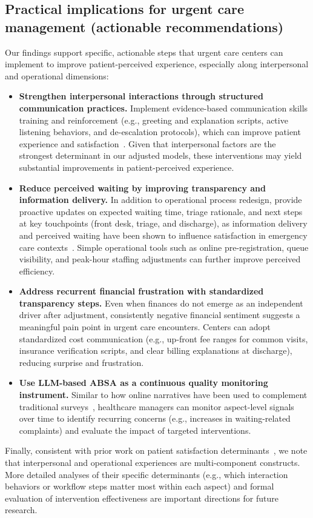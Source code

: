 \documentclass[journal,twoside,web]{ieeecolor}
\begin{document}
\subsection{Practical implications for urgent care management (actionable recommendations)}
Our findings support specific, actionable steps that urgent care centers can implement to improve patient-perceived experience, especially along interpersonal and operational dimensions:
\begin{itemize}
    \item \textbf{Strengthen interpersonal interactions through structured communication practices.} Implement evidence-based communication skills training and reinforcement (e.g., greeting and explanation scripts, active listening behaviors, and de-escalation protocols), which can improve patient experience and satisfaction~\cite{brown1999communication,derksen2013effectiveness}. Given that interpersonal factors are the strongest determinant in our adjusted models, these interventions may yield substantial improvements in patient-perceived experience.
    \item \textbf{Reduce perceived waiting by improving transparency and information delivery.} In addition to operational process redesign, provide proactive updates on expected waiting time, triage rationale, and next steps at key touchpoints (front desk, triage, and discharge), as information delivery and perceived waiting have been shown to influence satisfaction in emergency care contexts~\cite{thompson1996waiting,krishel1993info}. Simple operational tools such as online pre-registration, queue visibility, and peak-hour staffing adjustments can further improve perceived efficiency.
    \item \textbf{Address recurrent financial frustration with standardized transparency steps.} Even when finances do not emerge as an independent driver after adjustment, consistently negative financial sentiment suggests a meaningful pain point in urgent care encounters. Centers can adopt standardized cost communication (e.g., up-front fee ranges for common visits, insurance verification scripts, and clear billing explanations at discharge), reducing surprise and frustration.
    \item \textbf{Use LLM-based ABSA as a continuous quality monitoring instrument.} Similar to how online narratives have been used to complement traditional surveys~\cite{ranard2016yelp,kilaru2016edreviews}, healthcare managers can monitor aspect-level signals over time to identify recurring concerns (e.g., increases in waiting-related complaints) and evaluate the impact of targeted interventions.
\end{itemize}
Finally, consistent with prior work on patient satisfaction determinants~\cite{batbaatar2017determinants}, we note that interpersonal and operational experiences are multi-component constructs. More detailed analyses of their specific determinants (e.g., which interaction behaviors or workflow steps matter most within each aspect) and formal evaluation of intervention effectiveness are important directions for future research.
\end{document}
